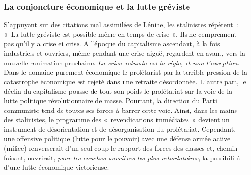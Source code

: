 \documentclass[french,twoside]{book} %
\begin{document}
\subsubsection[{La conjoncture économique et la lutte gréviste}]{La conjoncture économique et la lutte gréviste}
\noindent S’appuyant sur des citations mal assimilées de Lénine, les stalinistes répètent : « La lutte gréviste est possible même en temps de crise ». Ils ne comprennent pas qu’il y a crise et crise. A l’époque du capitalisme ascendant, à la fois industriels et ouvriers, même pendant une crise aiguë, regardent en avant, vers la nouvelle ranimation prochaine. \emph{La crise actuelle est la règle, et non l’exception}. Dans le domaine purement économique le prolétariat par la terrible pression de la catastrophe économique est rejeté dans une retraite désordonnée. D’autre part, le déclin du capitalisme pousse de tout son poids le prolétariat sur la voie de la lutte politique révolutionnaire de masse. Pourtant, la direction du Parti communiste tend de toutes ses forces à barrer cette voie. Ainsi, dans les mains des stalinistes, le programme des « revendications immédiates » devient un instrument de désorientation et de désorganisation du prolétariat. Cependant, une offensive politique (lutte pour le pouvoir) avec une défense armée active (milice) renverserait d’un seul coup le rapport des forces des classes et, chemin faisant, ouvrirait, \emph{pour les couches ouvrières les plus retardataires}, la possibilité d’une lutte économique victorieuse.
\end{document}
